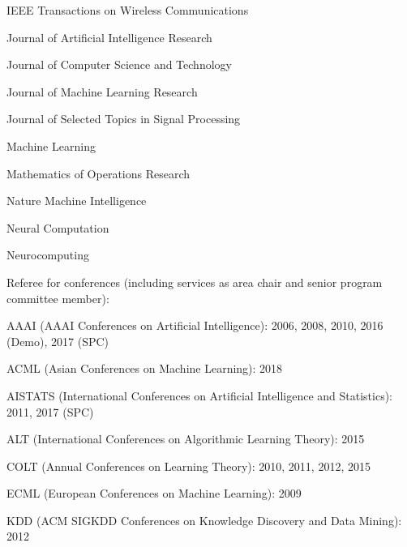 \documentclass[10pt,twoside,letterpaper]{article}
\newcommand{\negitemspace}{\vspace{1mm}}
\begin{document}
\begin{compactitem}
\begin{compactitem}
\item{IEEE Transactions on Wireless Communications}

\item{Journal of Artificial Intelligence Research}

\item{Journal of Computer Science and Technology}

\item{Journal of Machine Learning Research}

\item{Journal of Selected Topics in Signal Processing}

\item{Machine Learning}

\item{Mathematics of Operations Research}

\item{Nature Machine Intelligence}

\item{Neural Computation}

\item{Neurocomputing}

\end{compactitem} \negitemspace

\item{Referee for conferences (including services as area chair and senior program committee member):}

\begin{compactitem}

\item{AAAI (AAAI Conferences on Artificial Intelligence): 2006, 2008, 2010, 2016 (Demo), 2017 (SPC)}

\item{ACML (Asian Conferences on Machine Learning): 2018}

\item{AISTATS (International Conferences on Artificial Intelligence and Statistics): 2011, 2017 (SPC)}

\item{ALT (International Conferences on Algorithmic Learning Theory): 2015}

\item{COLT (Annual Conferences on Learning Theory): 2010, 2011, 2012, 2015}

\item{ECML (European Conferences on Machine Learning): 2009}

\item{KDD (ACM SIGKDD Conferences on Knowledge Discovery and Data Mining): 2012}


\end{compactitem}
\end{compactitem}
\end{document}
